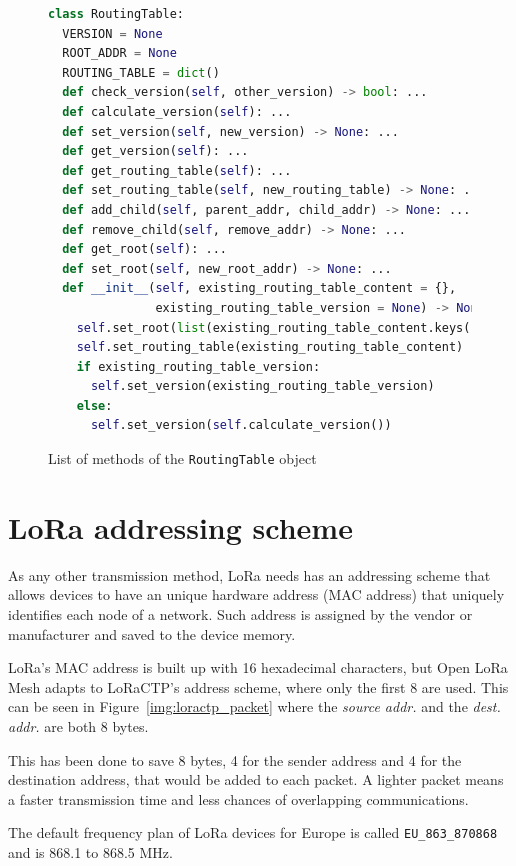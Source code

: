 				\begin{figure}[h]
					\begin{lstlisting}[language=python]
class RoutingTable:
  VERSION = None
  ROOT_ADDR = None
  ROUTING_TABLE = dict()
  def check_version(self, other_version) -> bool: ...
  def calculate_version(self): ...
  def set_version(self, new_version) -> None: ...
  def get_version(self): ...
  def get_routing_table(self): ...
  def set_routing_table(self, new_routing_table) -> None: ...
  def add_child(self, parent_addr, child_addr) -> None: ...
  def remove_child(self, remove_addr) -> None: ...
  def get_root(self): ...
  def set_root(self, new_root_addr) -> None: ...
  def __init__(self, existing_routing_table_content = {},
               existing_routing_table_version = None) -> None:
    self.set_root(list(existing_routing_table_content.keys())[0])
    self.set_routing_table(existing_routing_table_content)
    if existing_routing_table_version:
      self.set_version(existing_routing_table_version)    
    else:
      self.set_version(self.calculate_version())
					\end{lstlisting}
					\caption{List of methods of the \texttt{RoutingTable} object}
					\label{code:routing_table_functions}
				\end{figure}
				
	\section{LoRa addressing scheme}\label{subsec:lora_addressing}

		As any other transmission method, LoRa needs has an addressing scheme that allows devices to have an unique hardware address (MAC address) that uniquely identifies each node of a network.
		Such address is assigned by the vendor or manufacturer and saved to the device memory. 
		
		LoRa's MAC address is built up with 16 hexadecimal characters, but Open LoRa Mesh adapts to LoRaCTP's address scheme, where only the first 8 are used.
		This can be seen in Figure~\ref{img:loractp_packet} where the \textit{source addr.} and the \textit{dest. addr.} are both 8 bytes.
		
		This has been done to save 8 bytes, 4 for the sender address and 4 for the destination address, that would be added to each packet.
		A lighter packet means a faster transmission time and less chances of overlapping communications.
		
		The default frequency plan of LoRa devices for Europe is called \texttt{EU\_863\_870868} and is 868.1 to 868.5 MHz.

